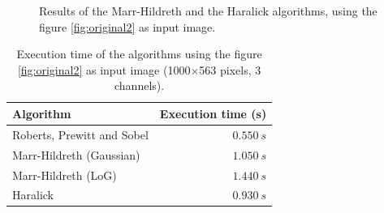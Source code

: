 \documentclass{ipol}
\numberwithin{equation}{section}
\numberwithin{table}{section}
\numberwithin{figure}{section}
\begin{document}
\begin{figure}[h!]
	\centering
	\quad
	
	\caption{Results of the Marr-Hildreth and the Haralick algorithms, using the figure \ref{fig:original2} as input image.}
	\label{fig:result3}
\end{figure}

\begin{table}[h!]
	\begin{center}
	\begin{tabular}{| l | r |}
		\hline \rule{0pt}{3ex}
		\cellcolor[gray]{0.8} \textbf{Algorithm}	& \cellcolor[gray]{0.8} \textbf{Execution time (s)}	\\ \hline \rule{0pt}{3ex}
		Roberts, Prewitt and Sobel					& $0.550 \ s$										\\ \hline \rule{0pt}{3ex}
		Marr-Hildreth (Gaussian)					& $1.050 \ s$										\\ \hline \rule{0pt}{3ex}
		Marr-Hildreth (LoG)							& $1.440 \ s$										\\ \hline \rule{0pt}{3ex}
		Haralick									& $0.930 \ s$										\\
		\hline
	\end{tabular}
	\end{center}
	\caption{Execution time of the algorithms using the figure \ref{fig:original2} as input image (1000$\times$563 pixels, 3 channels).}
	\label{exectime2}
\end{table}
\vspace{0.5cm}
\end{document}

